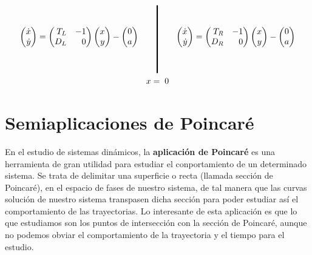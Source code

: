 \documentclass[12pt,a4paper]{report} %
\begin{document}
	\begin{equation}
		\label{eq:lienardrlgr}
		\begin{gathered}
			\begin{pmatrix*}[r]
				\dot{x}\\ \dot{y}
			\end{pmatrix*}= \begin{pmatrix*}[r]
				T_L & -1 \\ D_L & 0
			\end{pmatrix*} \begin{pmatrix*}[r]
				x \\ y
			\end{pmatrix*}-\begin{pmatrix*}[c]
				0 \\ a
			\end{pmatrix*} \qquad 
			\rule[-40pt]{1.5pt}{80pt} \qquad 
			\begin{pmatrix*}[r]
				\dot{x}\\ \dot{y}
			\end{pmatrix*}= \begin{pmatrix*}[r]
				T_R & -1 \\ D_R & 0
			\end{pmatrix*} \begin{pmatrix*}[r]
				x \\ y
			\end{pmatrix*}-\begin{pmatrix*}[c]
				0 \\ a
			\end{pmatrix*} \\ x=\;0
		\end{gathered}
	\end{equation}\smallskip
	
	\newpage
	
	\chapter{Semiaplicaciones de Poincaré}
	\label{sec:4}
	En el estudio de sistemas dinámicos, la \textbf{aplicación de Poincaré} es una herramienta de gran utilidad para estudiar el conportamiento de un determinado sistema. Se trata de delimitar una superficie o recta (llamada sección de Poincaré), en el espacio de fases de nuestro sistema, de tal manera que las curvas solución de nuestro sistema transpasen dicha sección para poder estudiar así el comportamiento de las trayectorias. Lo interesante de esta aplicación es que lo que estudiamos son los puntos de intersección con la sección de Poincaré, aunque no podemos obviar el comportamiento de la trayectoria y el tiempo para el estudio.\\[0.5cm]
	
\end{document}
